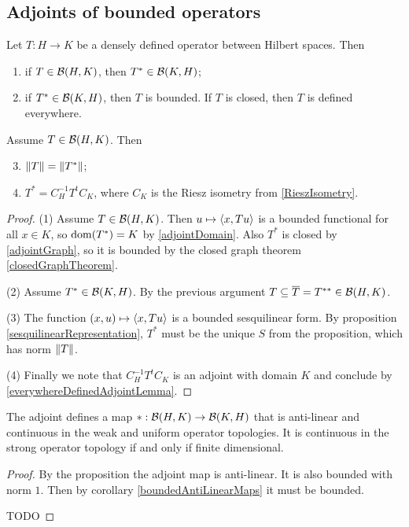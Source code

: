 \subsection{Adjoints of bounded operators}
\begin{proposition}
Let $T: H\to K$ be a densely defined operator between Hilbert spaces. Then
\begin{enumerate}
\item if $T\in\operatorname{\mathcal{B}}(H,K)$, then $T^*\in\operatorname{\mathcal{B}}(K,H)$;
\item if $T^*\in\operatorname{\mathcal{B}}(K,H)$, then $T$ is bounded. If $T$ is closed, then $T$ is defined everywhere.
\end{enumerate}
Assume $T\in\operatorname{\mathcal{B}}(H,K)$. Then
\begin{enumerate} \setcounter{enumi}{2}
\item $\lVert T\rVert = \lVert T^*\rVert$;
\item $T^* = C_H^{-1}T^tC_K$, where $C_K$ is the Riesz isometry from \ref{RieszIsometry}.
\end{enumerate}
\end{proposition}
\begin{proof}
(1) Assume $T\in\operatorname{\mathcal{B}}(H,K)$. Then $u\mapsto \left\langle x,Tu \right\rangle$ is a bounded functional for all $x\in K$, so $\operatorname{dom}(T^*) = K$ by \ref{adjointDomain}. Also $T^*$ is closed by \ref{adjointGraph}, so it is bounded by the closed graph theorem \ref{closedGraphTheorem}.

(2) Assume $T^*\in\operatorname{\mathcal{B}}(K,H)$. By the previous argument $T \subseteq \overline{T} = T^{**}\in\operatorname{\mathcal{B}}(H,K)$.

(3) The function $(x,u)\mapsto \left\langle x,Tu \right\rangle$ is a bounded sesquilinear form. By proposition \ref{sesquilinearRepresentation}, $T^*$ must be the unique $S$ from the proposition, which has norm $\lVert T\rVert$.

(4) Finally we note that $C_H^{-1}T^tC_K$ is an adjoint with domain $K$ and conclude by \ref{everywhereDefinedAdjointLemma}.
\end{proof}

\begin{lemma}
The adjoint defines a map $*:\operatorname{\mathcal{B}}(H,K)\to \operatorname{\mathcal{B}}(K,H)$ that is anti-linear and continuous in the weak and uniform operator topologies. It is continuous in the strong operator topology \textup{if and only if} finite dimensional.
\end{lemma}
\begin{proof}
By the proposition the adjoint map is anti-linear. It is also bounded with norm $1$. Then by corollary \ref{boundedAntiLinearMaps} it must be bounded.

TODO
\end{proof}

